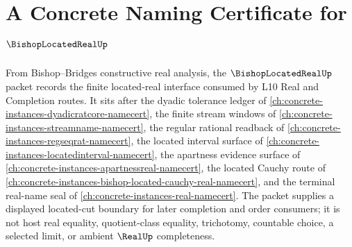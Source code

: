 \chapter{A Concrete Naming Certificate for $\BishopLocatedRealUp$}
\label{ch:concrete-instances-bishop-located-real-namecert}

From Bishop--Bridges constructive real analysis, the $\BishopLocatedRealUp$ packet records the finite located-real interface consumed by L10 Real and Completion routes. It sits after the dyadic tolerance ledger of \autoref{ch:concrete-instances-dyadicratcore-namecert}, the finite stream windows of \autoref{ch:concrete-instances-streamname-namecert}, the regular rational readback of \autoref{ch:concrete-instances-regseqrat-namecert}, the located interval surface of \autoref{ch:concrete-instances-locatedinterval-namecert}, the apartness evidence surface of \autoref{ch:concrete-instances-apartnessreal-namecert}, the located Cauchy route of \autoref{ch:concrete-instances-bishop-located-cauchy-real-namecert}, and the terminal real-name seal of \autoref{ch:concrete-instances-real-namecert}. The packet supplies a displayed located-cut boundary for later completion and order consumers; it is not host real equality, quotient-class equality, trichotomy, countable choice, a selected limit, or ambient $\RealUp$ completeness.

